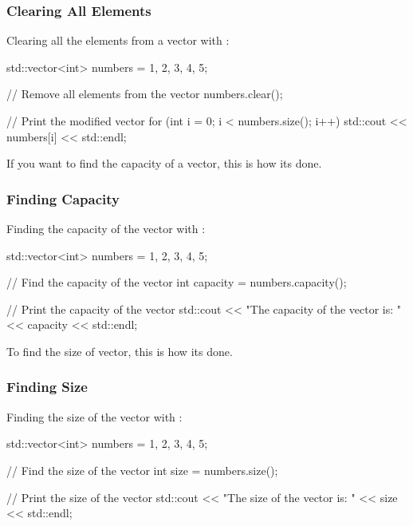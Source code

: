 \begin{highlight}

\subsubsection*{Clearing All Elements}

Clearing all the elements from a vector with :

\begin{code}
std::vector<int> numbers = {1, 2, 3, 4, 5};

// Remove all elements from the vector
numbers.clear();

// Print the modified vector
for (int i = 0; i < numbers.size(); i++) {
    std::cout << numbers[i] << std::endl;
}    
\end{code}

\end{highlight}

If you want to find the capacity of a vector, this is how its done.

\begin{highlight}

\subsubsection*{Finding Capacity}

Finding the capacity of the vector with :

\begin{code}
std::vector<int> numbers = {1, 2, 3, 4, 5};

// Find the capacity of the vector
int capacity = numbers.capacity();

// Print the capacity of the vector
std::cout << "The capacity of the vector is: " << capacity << std::endl;
\end{code}

\end{highlight}

To find the size of vector, this is how its done.

\begin{highlight}

\subsubsection*{Finding Size}

Finding the size of the vector with :

\begin{code}
std::vector<int> numbers = {1, 2, 3, 4, 5};

// Find the size of the vector
int size = numbers.size();

// Print the size of the vector
std::cout << "The size of the vector is: " << size << std::endl;
\end{code}

\end{highlight}

